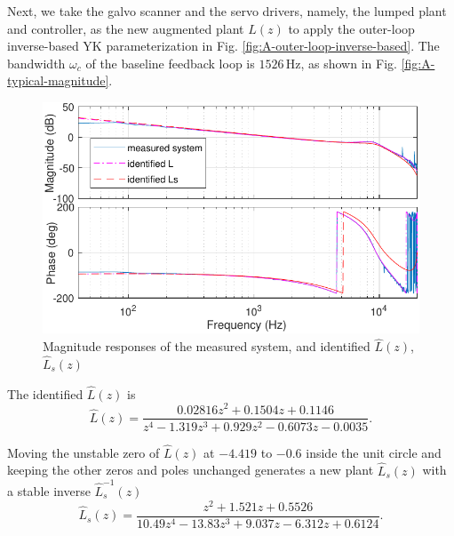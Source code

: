 \documentclass [11pt, proquest] {uwthesis}[2020/02/24]
\begin{document}
Next, we take the galvo scanner and the servo drivers, namely, the
lumped plant and controller, as the new augmented plant $L(z)$ to
apply the outer-loop inverse-based YK parameterization in Fig. \ref{fig:A-outer-loop-inverse-based}.
The bandwidth $\omega_{c}$ of the baseline feedback loop is $1526\,\text{Hz}$,
as shown in Fig. \ref{fig:A-typical-magnitude}.
\begin{figure}[!ht]
\begin{centering}
\includegraphics[width=13cm]{Loop-shaping/integrated_L_Ls_tf}
\par\end{centering}
\caption{\label{fig:Magnitude-response-of-1}Magnitude responses of the measured
system, and identified $\hat{L}(z)$, $\hat{L}_{s}(z)$ }
\end{figure}

The identified $\hat{L}(z)$ is
\begin{equation}
\hat{L}(z)=\frac{0.02816z^{2}+0.1504z+0.1146}{z^{4}-1.319z^{3}+0.929z^{2}-0.6073z-0.0035}.\label{eq:integrated_L}
\end{equation}

Moving the unstable zero of $\hat{L}(z)$ at $-4.419$ to $-0.6$
inside the unit circle and keeping the other zeros and poles unchanged
generates a new plant $\hat{L}_{s}(z)$ with a stable inverse $\hat{L}_{s}^{-1}(z)$
\begin{equation}
\hat{L}_{s}(z)=\frac{z^{2}+1.521z+0.5526}{10.49z^{4}-13.83z^{3}+9.037z-6.312z+0.6124}.\label{eq:integrated_L_stable}
\end{equation}
\end{document}
